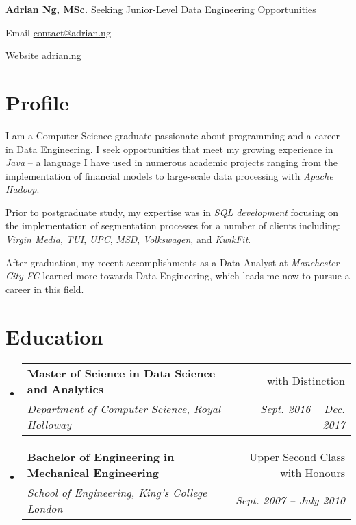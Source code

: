 \documentclass[letterpaper,11pt]{article}
\makeatletter
\newcommand{\resumeSubheading}[4]{
	\vspace{-1pt}\item
	\begin{tabular*}{0.97\textwidth}{l@{\extracolsep{\fill}}r}
		\textbf{#1} & #2 \\
		\textit{\small#3} & \textit{\small #4} \\
	\end{tabular*}\vspace{-5pt}
}
\newcommand{\resumeSubHeadingListStart}{\begin{itemize}[leftmargin=*]}
\newcommand{\resumeSubHeadingListEnd}{\end{itemize}}
\makeatother
\begin{document}
\noindent
\Large \textbf{Adrian Ng, MSc.}
\newline
\small
Seeking Junior-Level Data Engineering Opportunities
\hfill
\begin{description*}
	\item [Email] \href{mailto:contact@adrian.ng}{contact@adrian.ng}
	\item [Website] \href{https://adrian.ng}{adrian.ng}
\end{description*}
\section{Profile}
\begin{paragraph}
	I am a Computer Science graduate passionate about programming and a career in Data Engineering. I seek opportunities that meet my growing experience in \textit{Java} -- a language I have used in numerous academic projects ranging from the implementation of financial models to large-scale data processing with \textit{Apache Hadoop}.
	\par
	Prior to postgraduate study, my expertise was in \textit{SQL development} focusing on the implementation of segmentation processes for a number of clients including: \textit{Virgin Media}, \textit{TUI}, \textit{UPC}, \textit{MSD}, \textit{Volkswagen}, and \textit{KwikFit}.
	\par
	After graduation, my recent accomplishments as a Data Analyst at \textit{Manchester City FC} learned more towards Data Engineering, which leads me now to pursue a career in this field.
\end{paragraph}
\section{Education}
\resumeSubHeadingListStart
\resumeSubheading
{Master of Science in Data Science and Analytics}{with Distinction}
{Department of Computer Science, Royal Holloway}{Sept. 2016 -- Dec. 2017}

\resumeSubheading
{Bachelor of Engineering in Mechanical Engineering}{Upper Second Class with Honours}
{School of Engineering, King's College London}{Sept. 2007 -- July 2010}
\resumeSubHeadingListEnd
\end{document}
